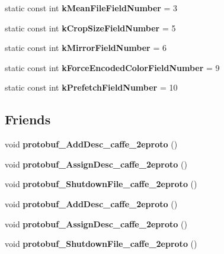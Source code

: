 \begin{DoxyCompactItemize}
static const int {\bfseries k\+Mean\+File\+Field\+Number} = 3
\item 
\mbox{\label{classcaffe_1_1_data_parameter_aa0baae26433b84013550529664169449}} 
static const int {\bfseries k\+Crop\+Size\+Field\+Number} = 5
\item 
\mbox{\label{classcaffe_1_1_data_parameter_aa31be85fc8b1995f1ec9377c502251c4}} 
static const int {\bfseries k\+Mirror\+Field\+Number} = 6
\item 
\mbox{\label{classcaffe_1_1_data_parameter_a3b2230dcdae7b7e36f4f1c35f69664fb}} 
static const int {\bfseries k\+Force\+Encoded\+Color\+Field\+Number} = 9
\item 
\mbox{\label{classcaffe_1_1_data_parameter_acdf079ddb10dfe5f689413dbbf899f75}} 
static const int {\bfseries k\+Prefetch\+Field\+Number} = 10
\end{DoxyCompactItemize}
\subsection*{Friends}
\begin{DoxyCompactItemize}
\item 
\mbox{\label{classcaffe_1_1_data_parameter_a2670a9c8ffd0e5105cf7522cd6f8613d}} 
void {\bfseries protobuf\+\_\+\+Add\+Desc\+\_\+caffe\+\_\+2eproto} ()
\item 
\mbox{\label{classcaffe_1_1_data_parameter_a7f145bddbdde78003d27e42c7e003d23}} 
void {\bfseries protobuf\+\_\+\+Assign\+Desc\+\_\+caffe\+\_\+2eproto} ()
\item 
\mbox{\label{classcaffe_1_1_data_parameter_a026784a8e4e76f1b4daf9d033d2ece83}} 
void {\bfseries protobuf\+\_\+\+Shutdown\+File\+\_\+caffe\+\_\+2eproto} ()
\item 
\mbox{\label{classcaffe_1_1_data_parameter_a2670a9c8ffd0e5105cf7522cd6f8613d}} 
void {\bfseries protobuf\+\_\+\+Add\+Desc\+\_\+caffe\+\_\+2eproto} ()
\item 
\mbox{\label{classcaffe_1_1_data_parameter_a7f145bddbdde78003d27e42c7e003d23}} 
void {\bfseries protobuf\+\_\+\+Assign\+Desc\+\_\+caffe\+\_\+2eproto} ()
\item 
\mbox{\label{classcaffe_1_1_data_parameter_a026784a8e4e76f1b4daf9d033d2ece83}} 
void {\bfseries protobuf\+\_\+\+Shutdown\+File\+\_\+caffe\+\_\+2eproto} ()
\end{DoxyCompactItemize}


